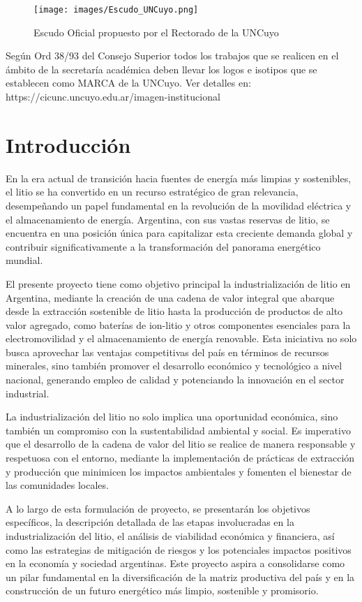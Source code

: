 \documentclass[crop=false]{standalone}
\begin{document}
\begin{figure}
\centering
\texttt{[image: images/Escudo\_UNCuyo.png]}
\label{fig:lionfigure}
\caption{Escudo Oficial propuesto por el Rectorado de la UNCuyo}
\end{figure}

Según Ord 38/93 del Consejo Superior todos los trabajos que se realicen en el ámbito de la secretaría académica deben llevar los logos e isotipos que se establecen como MARCA de la UNCuyo. 
Ver detalles en: https://cicunc.uncuyo.edu.ar/imagen-institucional

\section{Introducción}
En la era actual de transición hacia fuentes de energía más limpias y sostenibles, el litio se ha convertido en un recurso estratégico de gran relevancia, desempeñando un papel fundamental en la revolución de la movilidad eléctrica y el almacenamiento de energía. Argentina, con sus vastas reservas de litio, se encuentra en una posición única para capitalizar esta creciente demanda global y contribuir significativamente a la transformación del panorama energético mundial.

El presente proyecto tiene como objetivo principal la industrialización de litio en Argentina, mediante la creación de una cadena de valor integral que abarque desde la extracción sostenible de litio hasta la producción de productos de alto valor agregado, como baterías de ion-litio y otros componentes esenciales para la electromovilidad y el almacenamiento de energía renovable. Esta iniciativa no solo busca aprovechar las ventajas competitivas del país en términos de recursos minerales, sino también promover el desarrollo económico y tecnológico a nivel nacional, generando empleo de calidad y potenciando la innovación en el sector industrial.

La industrialización del litio no solo implica una oportunidad económica, sino también un compromiso con la sustentabilidad ambiental y social. Es imperativo que el desarrollo de la cadena de valor del litio se realice de manera responsable y respetuosa con el entorno, mediante la implementación de prácticas de extracción y producción que minimicen los impactos ambientales y fomenten el bienestar de las comunidades locales.

A lo largo de esta formulación de proyecto, se presentarán los objetivos específicos, la descripción detallada de las etapas involucradas en la industrialización del litio, el análisis de viabilidad económica y financiera, así como las estrategias de mitigación de riesgos y los potenciales impactos positivos en la economía y sociedad argentinas. Este proyecto aspira a consolidarse como un pilar fundamental en la diversificación de la matriz productiva del país y en la construcción de un futuro energético más limpio, sostenible y promisorio.
\end{document}
